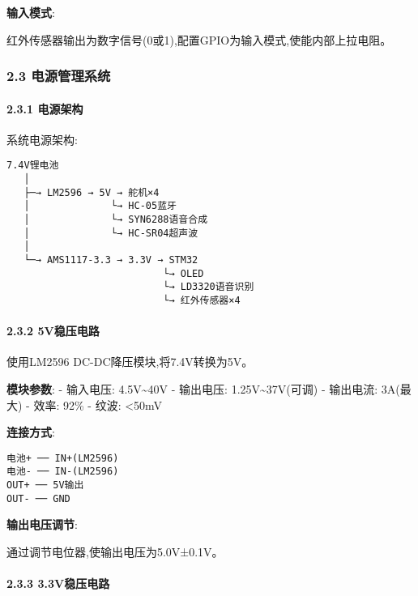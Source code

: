 \documentclass[
]{article}
\begin{document}
\textbf{输入模式}:

红外传感器输出为数字信号(0或1),配置GPIO为输入模式,使能内部上拉电阻。

\hypertarget{ux7535ux6e90ux7ba1ux7406ux7cfbux7edf}{%
\subsubsection{2.3
电源管理系统}\label{ux7535ux6e90ux7ba1ux7406ux7cfbux7edf}}

\hypertarget{ux7535ux6e90ux67b6ux6784}{%
\paragraph{2.3.1 电源架构}\label{ux7535ux6e90ux67b6ux6784}}

系统电源架构:

\begin{verbatim}
7.4V锂电池
   │
   ├─→ LM2596 → 5V → 舵机×4
   │              └→ HC-05蓝牙
   │              └→ SYN6288语音合成
   │              └→ HC-SR04超声波
   │
   └─→ AMS1117-3.3 → 3.3V → STM32
                           └→ OLED
                           └→ LD3320语音识别
                           └→ 红外传感器×4
\end{verbatim}

\hypertarget{vux7a33ux538bux7535ux8def}{%
\paragraph{2.3.2 5V稳压电路}\label{vux7a33ux538bux7535ux8def}}

使用LM2596 DC-DC降压模块,将7.4V转换为5V。

\textbf{模块参数}: - 输入电压: 4.5V\textasciitilde40V - 输出电压:
1.25V\textasciitilde37V(可调) - 输出电流: 3A(最大) - 效率: 92\% - 纹波:
\textless50mV

\textbf{连接方式}:

\begin{verbatim}
电池+ ── IN+(LM2596)
电池- ── IN-(LM2596)
OUT+ ── 5V输出
OUT- ── GND
\end{verbatim}

\textbf{输出电压调节}:

通过调节电位器,使输出电压为5.0V±0.1V。

\hypertarget{vux7a33ux538bux7535ux8def-1}{%
\paragraph{2.3.3 3.3V稳压电路}\label{vux7a33ux538bux7535ux8def-1}}
\end{document}
